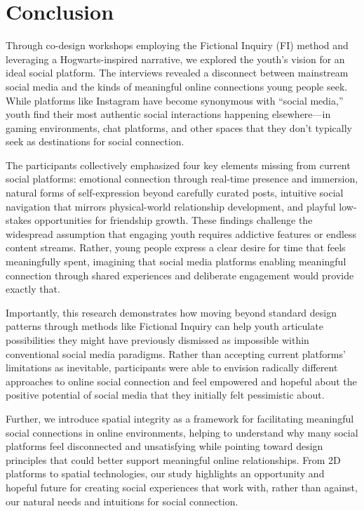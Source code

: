\section{Conclusion}
Through co-design workshops employing the Fictional Inquiry (FI) method and leveraging a Hogwarts-inspired narrative, we explored the youth's vision for an ideal social platform. The interviews revealed a disconnect between mainstream social media and the kinds of meaningful online connections young people seek. While platforms like Instagram have become synonymous with ``social media,'' youth find their most authentic social interactions happening elsewhere---in gaming environments, chat platforms, and other spaces that they don't typically seek as destinations for social connection.

The participants collectively emphasized four key elements missing from current social platforms: emotional connection through real-time presence and immersion, natural forms of self-expression beyond carefully curated posts, intuitive social navigation that mirrors physical-world relationship development, and playful low-stakes opportunities for friendship growth. These findings challenge the widespread assumption that engaging youth requires addictive features or endless content streams. Rather, young people express a clear desire for time that feels meaningfully spent, imagining that social media platforms enabling meaningful connection through shared experiences and deliberate engagement would provide exactly that.

Importantly, this research demonstrates how moving beyond standard design patterns through methods like Fictional Inquiry can help youth articulate possibilities they might have previously dismissed as impossible within conventional social media paradigms. Rather than accepting current platforms' limitations as inevitable, participants were able to envision radically different approaches to online social connection and feel empowered and hopeful about the positive potential of social media that they initially felt pessimistic about.

Further, we introduce spatial integrity as a framework for facilitating meaningful social connections in online environments, helping to understand why many social platforms feel disconnected and unsatisfying while pointing toward design principles that could better support meaningful online relationships. From 2D platforms to spatial technologies, our study highlights an opportunity and hopeful future for creating social experiences that work with, rather than against, our natural needs and intuitions for social connection.